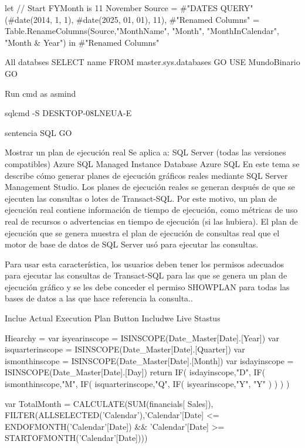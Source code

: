 let
    // Start FYMonth is 11 November
    Source = #"DATES QUERY"(#date(2014, 1, 1), #date(2025, 01, 01), 11),
    #"Renamed Columns" = Table.RenameColumns(Source,{{"MonthName", "Month"}, {"MonthInCalendar", "Month & Year"}})
in
    #"Renamed Columns"




All databses
SELECT name FROM master.sys.databases
GO
USE MundoBinario
GO


	Run cmd as asmind

	sqlcmd -S DESKTOP-08LNEUA\SQLEXPRESS -E

sentencia  SQL
GO 





Mostrar un plan de ejecución real
Se aplica a: SQL Server (todas las versiones compatibles)  Azure SQL Managed Instance Database  Azure SQL
En este tema se describe cómo generar planes de ejecución gráficos reales mediante SQL Server Management Studio. Los planes de ejecución reales se generan después de que se ejecuten las consultas o lotes de Transact-SQL. Por este motivo, un plan de ejecución real contiene información de tiempo de ejecución, como métricas de uso real de recursos o advertencias en tiempo de ejecución (si las hubiera). El plan de ejecución que se genera muestra el plan de ejecución de consultas real que el motor de base de datos de SQL Server usó para ejecutar las consultas.

Para usar esta característica, los usuarios deben tener los permisos adecuados para ejecutar las consultas de Transact-SQL para las que se genera un plan de ejecución gráfico y se les debe conceder el permiso SHOWPLAN para todas las bases de datos a las que hace referencia la consulta..


Inclue Actual Execution Plan Button
Includwe Live Stastus 





Hiearchy = 
var isyearinscope = ISINSCOPE(Date_Master[Date].[Year])
var isquarterinscope = ISINSCOPE(Date_Master[Date].[Quarter])
var ismonthinscope = ISINSCOPE(Date_Master[Date].[Month])
var isdayinscope = ISINSCOPE(Date_Master[Date].[Day])
return
IF(
    isdayinscope,"D",
    IF(
        ismonthinscope,"M",
        IF(
            isquarterinscope,"Q",
            IF(
                isyearinscope,"Y",
                "Y"
                )
            )
        )
    )



    var TotalMonth = CALCULATE(SUM(financials[ Sales]), FILTER(ALLSELECTED('Calendar'),'Calendar'[Date] <= ENDOFMONTH('Calendar'[Date]) && 'Calendar'[Date] >= STARTOFMONTH('Calendar'[Date])))



